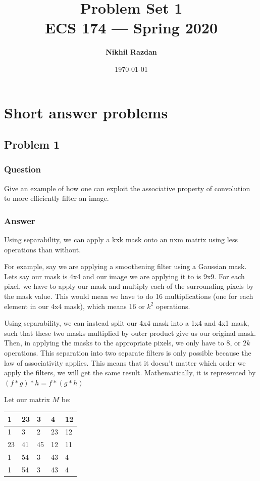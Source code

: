 \documentclass[12pt]{article}
\title{\bf Problem Set 1\\[2ex] 
       \rm\normalsize ECS 174 --- Spring 2020}
\date{\today}
\author{\bf Nikhil Razdan}
\begin{document}
\maketitle

\newpage
\section*{Short answer problems}
\subsection*{Problem 1}
\subsubsection*{Question}
Give an example of how one can exploit the associative property of convolution to more
efficiently filter an image.

\subsubsection*{Answer}
Using separability, we can apply a kxk mask onto an nxm matrix using less operations than without.

\noindent
For example, say we are applying a smoothening filter using a Gaussian mask. Lets say our mask is 4x4 and our image we are applying it to is 9x9. For each pixel, we have to apply our mask and multiply each of the surrounding pixels by the mask value. This would mean we have to do 16 multiplications (one for each element in our 4x4 mask), which means 16 or $k^2$ operations.

\noindent
Using separability, we can instead split our 4x4 mask into a 1x4 and 4x1 mask, such that these two masks multiplied by outer product give us our original mask. Then, in applying the masks to the appropriate pixels, we only have to 8, or $2k$ operations. This separation into two separate filters is only possible because the law of associativity applies. This means that it doesn't matter which order we apply the filters, we will get the same result. Mathematically, it is represented by $(f * g) * h = f * (g * h)$

\noindent
Let our matrix $M$ be:
\begin{table}[h!]
\begin{tabular}{|l|l|l|l|l|}
\hline
1  & 23 & 3  & 4  & 12 \\ \hline
1  & 3  & 2  & 23 & 12 \\ \hline
23 & 41 & 45 & 12 & 11 \\ \hline
1  & 54 & 3  & 43 & 4  \\ \hline
1  & 54 & 3  & 43 & 4  \\ \hline
\end{tabular}
\end{table}
\end{document}
